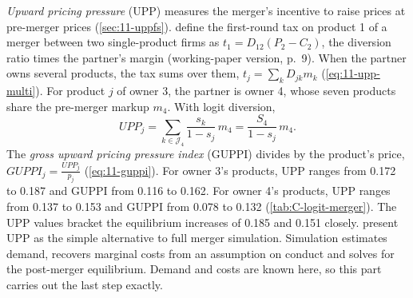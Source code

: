 \emph{Upward pricing pressure} (UPP) measures the merger's incentive to raise prices at pre-merger prices
(\cref{sec:11-uppfs}). \citet{FarrellShapiro2010} define the first-round tax on product 1 of a merger between two
single-product firms as $t_1 = D_{12}(P_2 - C_2)$, the diversion ratio times the partner's margin (working-paper
version, p.~9). When the partner owns several products, the tax sums over them, $t_j = \sum_kD_{jk}m_k$
(\cref{eq:11-upp-multi}). For product $j$ of owner 3, the partner is owner 4, whose seven products share the
pre-merger markup $m_4$. With logit diversion,
\begin{equation}\label{eq:C-upp-logit}
  \mathit{UPP}_j = \sum_{k \in \mathcal{J}_4}\frac{s_k}{1 - s_j}\,m_4 = \frac{S_4}{1 - s_j}\,m_4 .
\end{equation}
The \emph{gross upward pricing pressure index} (GUPPI) divides by the product's price, $\mathit{GUPPI}_j = \frac{\mathit{UPP}_j}{p_j}$
(\cref{eq:11-guppi}). For owner 3's products, UPP ranges from 0.172 to 0.187 and GUPPI from 0.116 to 0.162. For
owner 4's products, UPP ranges from 0.137 to 0.153 and GUPPI from 0.078 to 0.132
(\cref{tab:C-logit-merger}). The UPP values bracket the equilibrium increases of 0.185 and 0.151 closely.
\citet[Section~3.3.2, pp.~230--231]{AskerNocke2021} present UPP as the simple alternative to full merger simulation.
Simulation estimates demand, recovers marginal costs from an assumption on conduct and solves for the post-merger
equilibrium. Demand and costs are known here, so this part carries out the last step exactly.

